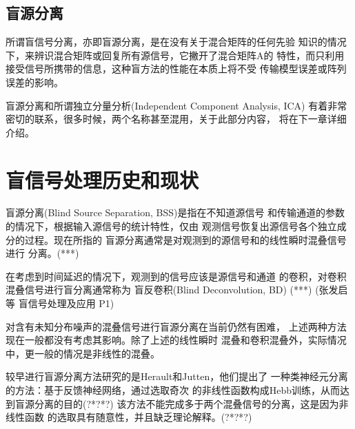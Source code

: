 \subsection{盲源分离}
所谓盲信号分离，亦即盲源分离，是在没有关于混合矩阵的任何先验
知识的情况下，来辨识混合矩阵或回复所有源信号，它撇开了混合矩阵A的
特性，而只利用接受信号所携带的信息，这种盲方法的性能在本质上将不受
传输模型误差或阵列误差的影响。

盲源分离和所谓独立分量分析(Independent Component Analysis, ICA)
有着非常密切的联系，很多时候，两个名称甚至混用，关于此部分内容，
将在下一章详细介绍。
































\section{盲信号处理历史和现状}
盲源分离(Blind Source Separation, BSS)是指在不知道源信号
和传输通道的参数的情况下，根据输入源信号的统计特性，仅由
观测信号恢复出源信号各个独立成分的过程。现在所指的
盲源分离通常是对观测到的源信号和的线性瞬时混叠信号进行
分离。(***)

在考虑到时间延迟的情况下，观测到的信号应该是源信号和通道
的卷积，对卷积混叠信号进行盲分离通常称为
盲反卷积(Blind Deconvolution, BD) (***)
(张发启 等 盲信号处理及应用 P1)

对含有未知分布噪声的混叠信号进行盲源分离在当前仍然有困难，
上述两种方法现在一般都没有考虑其影响。除了上述的线性瞬时
混叠和卷积混叠外，实际情况中，更一般的情况是非线性的混叠。

较早进行盲源分离方法研究的是Herault和Jutten，他们提出了
一种类神经元分离的方法：基于反馈神经网络，通过选取奇次
的非线性函数构成Hebb训练，从而达到盲源分离的目的(?*?*?)
该方法不能完成多于两个混叠信号的分离，这是因为非线性函数
的选取具有随意性，并且缺乏理论解释。(?*?*?)

